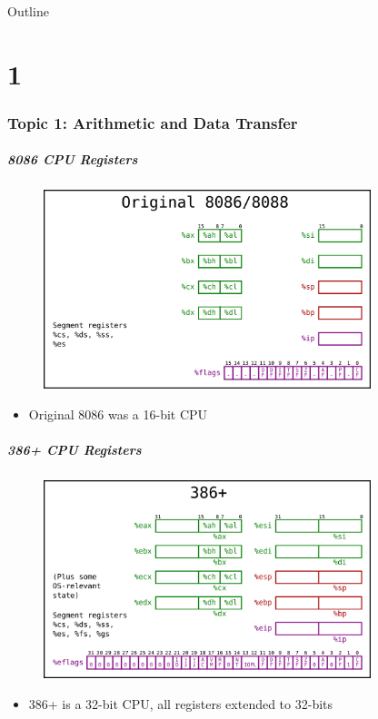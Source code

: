 \documentclass[11pt,xcolor=dvipsnames]{beamer}
\begin{document}
\begin{frame}{Outline}
\tableofcontents[part=2]
\end{frame}

\part{1}

\section{Topic 1: Arithmetic and Data Transfer}
\begin{frame}[fragile,t]
\frametitle{8086 CPU Registers}
\begin{figure}
\centering \includegraphics[width=0.85\textwidth]{figures/8086state.png}
\end{figure}
\begin{itemize}
    \item Original 8086 was a 16-bit CPU
\end{itemize}
\end{frame}

\begin{frame}[fragile,t]
\frametitle{386+ CPU Registers}
\begin{figure}
\centering \includegraphics[width=0.85\textwidth]{figures/386state.png}
\end{figure}
\begin{itemize}
    \item 386+ is a 32-bit CPU, all registers extended to 32-bits
\end{itemize}
\end{frame}
\end{document}
